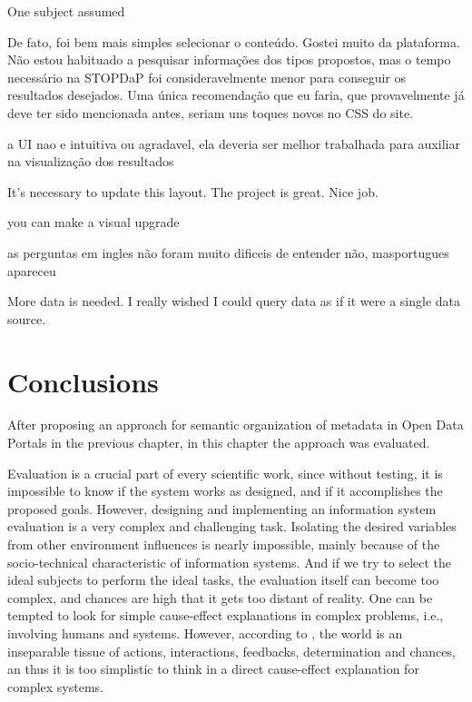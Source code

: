 One subject assumed



De fato, foi bem mais simples selecionar o conteúdo. Gostei muito da plataforma. Não estou habituado a pesquisar informações dos tipos propostos, mas o tempo necessário na STOPDaP foi consideravelmente menor para conseguir os resultados desejados. Uma única recomendação que eu faria, que provavelmente já deve ter sido mencionada antes, seriam uns toques novos no CSS do site. 

a UI nao e intuitiva ou agradavel, ela deveria ser melhor trabalhada para auxiliar na visualização dos resultados

It's necessary to update this layout. The project is great. Nice job.

you can make a visual upgrade

as perguntas em ingles não foram muito dificeis de entender não, masportugues apareceu

More data is needed. I really wished I could query data as if it were a single data source.


\section{Conclusions}
\label{sec:conclusion}

After proposing an approach for semantic organization of metadata in Open Data Portals in the previous chapter, in this chapter the approach was evaluated.

Evaluation is a crucial part of every scientific work, since without testing, it is impossible to know if the system works as designed, and if it accomplishes the proposed goals.
However, designing and implementing an information system evaluation is a very complex and challenging task.
Isolating the desired variables from other environment influences is nearly impossible, mainly because of the socio-technical characteristic of information systems.
And if we try to select the ideal subjects to perform the ideal tasks, the evaluation itself can become too complex, and chances are high that it gets too distant of reality.
One can be tempted to look for simple cause-effect explanations in complex problems, i.e., involving humans and systems.
However, according to , the world is an inseparable tissue of actions, interactions, feedbacks, determination and chances, an thus it is too simplistic to think in a direct cause-effect explanation for complex systems.


